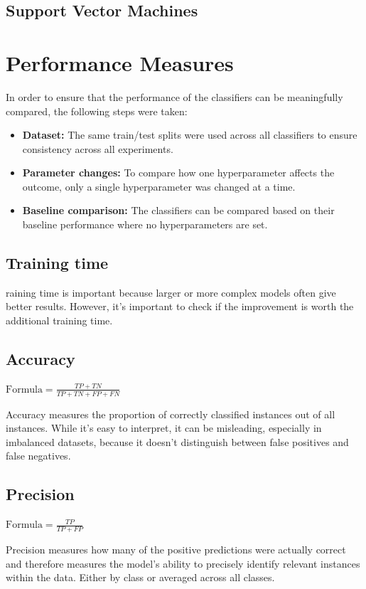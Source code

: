 \documentclass{article}
\begin{document}
\subsection{Support Vector Machines}

\section{Performance Measures}
In order to ensure that the performance of the classifiers can be meaningfully compared, the following steps were taken:
\begin{itemize}
    \item \textbf{Dataset:} The same train/test splits were used across all classifiers to ensure consistency across all experiments.
    \item \textbf{Parameter changes:} To compare how one hyperparameter affects the outcome, only a single hyperparameter was changed at a time.
    \item \textbf{Baseline comparison:} The classifiers can be compared based on their baseline performance where no hyperparameters are set.
\end{itemize}

\subsection{Training time}
raining time is important because larger or more complex models often give better results. However, it's important to check if the improvement is worth the additional training time.

\subsection{Accuracy}
$\text{Formula} = \frac{TP + TN}{TP + TN + FP + FN}$

Accuracy measures the proportion of correctly classified instances out of all instances. While it’s easy to interpret, it can be misleading, especially in imbalanced datasets, because it doesn't distinguish between false positives and false negatives.

\subsection{Precision}
$\text{Formula} = \frac{TP}{TP + FP}$

Precision measures how many of the positive predictions were actually correct and therefore measures the model’s ability to precisely identify relevant instances within the data. Either by class or averaged across all classes.
\end{document}

